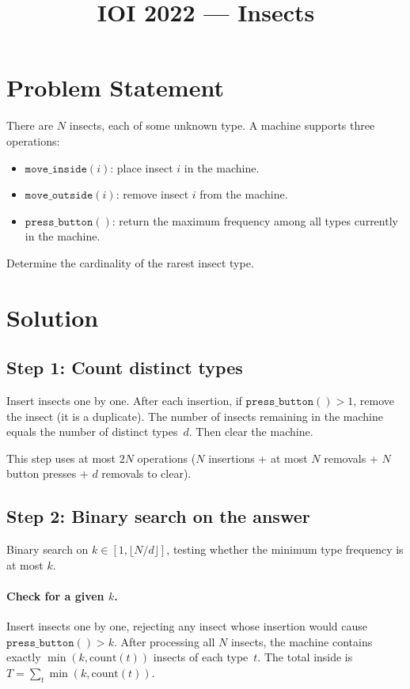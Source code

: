 \documentclass[11pt,a4paper]{article}
\title{IOI 2022 --- Insects}
\author{}
\date{}
\begin{document}
\maketitle

\section{Problem Statement}

There are $N$ insects, each of some unknown type.  A machine supports
three operations:
\begin{itemize}
  \item $\texttt{move\_inside}(i)$: place insect $i$ in the machine.
  \item $\texttt{move\_outside}(i)$: remove insect $i$ from the machine.
  \item $\texttt{press\_button}()$: return the maximum frequency among all
        types currently in the machine.
\end{itemize}
Determine the cardinality of the rarest insect type.

\section{Solution}

\subsection{Step 1: Count distinct types}

Insert insects one by one.  After each insertion, if
$\texttt{press\_button}() > 1$, remove the insect (it is a duplicate).
The number of insects remaining in the machine equals the number of
distinct types~$d$.  Then clear the machine.

This step uses at most $2N$ operations ($N$ insertions + at most $N$ removals
+ $N$ button presses + $d$ removals to clear).

\subsection{Step 2: Binary search on the answer}

Binary search on $k \in [1, \lfloor N/d \rfloor]$, testing whether the
minimum type frequency is at most $k$.

\paragraph{Check for a given $k$.}
Insert insects one by one, rejecting any insect whose insertion would
cause $\texttt{press\_button}() > k$.  After processing all $N$ insects, the
machine contains exactly $\min(k, \mathrm{count}(t))$ insects of each type~$t$.
The total inside is $T = \sum_t \min(k, \mathrm{count}(t))$.
\end{document}
